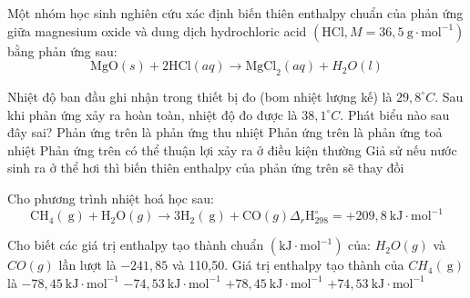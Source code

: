 \begin{ex}
	Một nhóm học sinh nghiên cứu xác định biến thiên enthalpy chuẩn của phản ứng giữa magnesium oxide và dung dịch hydrochloric acid $\left(\mathrm{HCl}, M=36,5\mathrm{~g} \cdot \mathrm{mol}^{-1}\right)$ bằng phản ứng sau:
	$$
	\mathrm{MgO}(s)+2 \mathrm{HCl}(a q) \to \mathrm{MgCl}_2(a q)+H_2 O(l)
	$$
	
	Nhiệt độ ban đầu ghi nhận trong thiết bị đo (bom nhiệt lượng kế) là $29,8^{\circ} C$. Sau khi phản ứng xảy ra hoàn toàn, nhiệt độ đo được là $38,1^{\circ} C$. Phát biểu nào sau đây sai?
	\choice
	{Phản ứng trên là phản ứng thu nhiệt}
	{Phản ứng trên là phản ứng toả nhiệt}
	{Phản ứng trên có thể thuận lợi xảy ra ở điều kiện thường}
	{Giả sử nếu nước sinh ra ở thể hơi thì biến thiên enthalpy của phản ứng trên sẽ thay đồi}
	\loigiai{}
\end{ex}
\begin{ex}
	Cho phương trình nhiệt hoá học sau:
	$$
	\mathrm{CH}_4(\mathrm{~g})+\mathrm{H}_2\mathrm{O}(g) \to 3 \mathrm{H}_2(\mathrm{~g})+\mathrm{CO}(g) \Delta_r \mathrm{H}_{298}^{\circ}=+209,8 \mathrm{~kJ} \cdot \mathrm{mol}^{-1}
	$$
	
	Cho biết các giá trị enthalpy tạo thành chuẩn $\left(\mathrm{kJ} \cdot \mathrm{mol}^{-1}\right)$ của: $H_2O(g)$ và $CO(g)$ lần lượt là $-241,85$ và 110,50. Giá trị enthalpy tạo thành của $CH_4(\mathrm{~g})$ là
	\choice
	{$-78,45\mathrm{~kJ} \cdot \mathrm{mol}^{-1}$}
	{$-74,53\mathrm{~kJ} \cdot \mathrm{mol}^{-1}$}
	{$+78,45\mathrm{~kJ} \cdot \mathrm{mol}^{-1}$}
	{$+74,53\mathrm{~kJ} \cdot \mathrm{mol}^{-1}$}
	\loigiai{}
\end{ex}
\begin{ex}[1 điểm]
	\loigiai{}
\end{ex}
